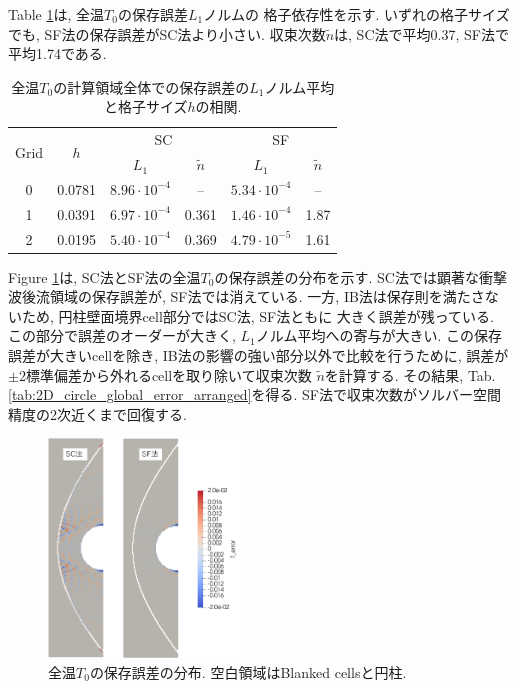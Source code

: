 \documentclass[a4j]{jarticle}
\begin{document}
Table \ref{tab:2D_circle_global_error}は, 全温$T_0$の保存誤差$L_1$ノルムの
格子依存性を示す. いずれの格子サイズでも, SF法の保存誤差がSC法より小さい.
収束次数$\tilde{n}$は, SC法で平均0.37, SF法で平均1.74である.
\begin{table}[h]
  \centering
  \caption{全温$T_0$の計算領域全体での保存誤差の$L_1$ノルム平均と格子サイズ$h$の相関.}
  \begin{tabular}{cccccc}
    \toprule
    \multirow{2}{*}{Grid} & \multirow{2}{*}{$h$}
    & \multicolumn{2}{c}{SC} & \multicolumn{2}{c}{SF} \\
    \cmidrule(lr){3-4} \cmidrule(lr){5-6}
    & & $L_1$ & $\tilde{n}$ & $L_1$ & $\tilde{n}$ \\
    \midrule
    0 & 0.0781 & $8.96 \cdot 10^{-4}$ & –    & $5.34 \cdot 10^{-4}$ & – \\
    1 & 0.0391 & $6.97 \cdot 10^{-4}$ & 0.361 & $1.46 \cdot 10^{-4}$ & 1.87 \\
    2 & 0.0195 & $5.40 \cdot 10^{-4}$ & 0.369 & $4.79 \cdot 10^{-5}$ & 1.61 \\
    \bottomrule
  \end{tabular} 
  \label{tab:2D_circle_global_error}
\end{table}
Figure \ref{fig:2Dcircle_t_error_distribution}は, SC法とSF法の全温$T_0$の保存誤差の分布を示す.
SC法では顕著な衝撃波後流領域の保存誤差が, SF法では消えている.
一方, IB法は保存則を満たさないため, 円柱壁面境界cell部分ではSC法, SF法ともに
大きく誤差が残っている.
この部分で誤差のオーダーが大きく, $L_1$ノルム平均への寄与が大きい. 
この保存誤差が大きいcellを除き, IB法の影響の強い部分以外で比較を行うために, 
誤差が$\pm 2$標準偏差から外れるcellを取り除いて収束次数 $\tilde{n}$を計算する.
その結果, Tab.\ref{tab:2D_circle_global_error_arranged}を得る.
SF法で収束次数がソルバー空間精度の2次近くまで回復する. 
\begin{figure}[h]
    \begin{center}
        \includegraphics[width=0.45\textwidth]{t_error_distribution.pdf}
    \end{center}
    \caption{全温$T_0$の保存誤差の分布. 空白領域はBlanked cellsと円柱.}
    \label{fig:2Dcircle_t_error_distribution}
\end{figure}
\end{document}
